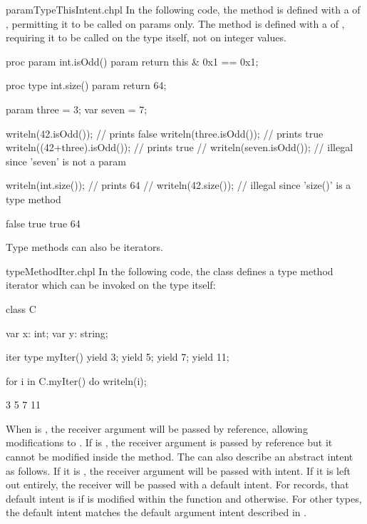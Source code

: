 \begin{chapelexample}{paramTypeThisIntent.chpl}
In the following code, the  method is defined with
a  of , permitting it to be called on
params only.  The  method is defined with
a  of , requiring it to be called on
the  type itself, not on integer values.
\begin{chapel}
proc param int.isOdd() param {
  return this & 0x1 == 0x1;
}

proc type int.size() param {
  return 64;
}

param three = 3;
var seven = 7;

writeln(42.isOdd());          // prints false
writeln(three.isOdd());       // prints true
writeln((42+three).isOdd());  // prints true
// writeln(seven.isOdd());    // illegal since 'seven' is not a param

writeln(int.size());          // prints 64
// writeln(42.size());        // illegal since 'size()' is a type method
\end{chapel}
\begin{chapeloutput}
false
true
true
64
\end{chapeloutput}
\end{chapelexample}

Type methods can also be iterators.

\begin{chapelexample}{typeMethodIter.chpl}
In the following code, the class  defines a type method
iterator which can be invoked on the type itself:
\begin{chapel}
class C {
  var x: int;
  var y: string;

  iter type myIter() {
    yield 3;
    yield 5;
    yield 7;
    yield 11;
  }
}

for i in C.myIter() do
  writeln(i);
\end{chapel}
\begin{chapeloutput}
3
5
7
11
\end{chapeloutput}
\end{chapelexample}

When  is , the receiver argument will be
passed by reference, allowing modifications to .  If
 is , the receiver argument is passed
by reference but it cannot be modified inside the method. The
 can also describe an abstract intent as follows. If it is
, the receiver argument will be passed with 
intent. If it is left out entirely, the receiver will be passed with
a default intent. For records, that default intent is  if
 is modified within the function and 
otherwise.  For other types, the default  intent matches the
default argument intent described in .

